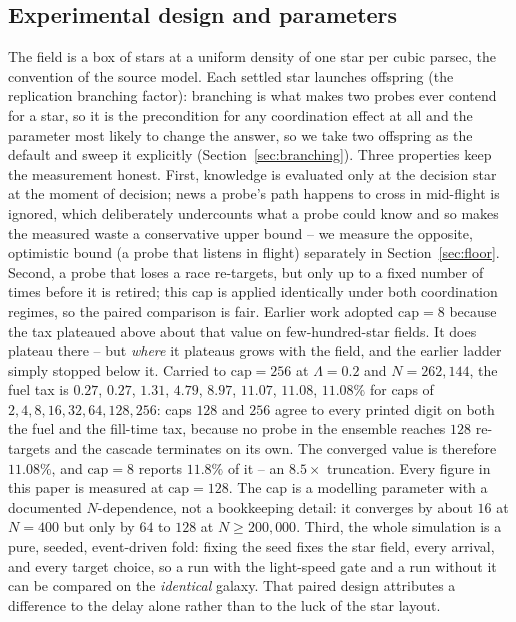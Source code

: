 \subsection{Experimental design and parameters}
The field is a box of stars at a uniform density of one star per cubic parsec, the convention of
the source model. Each settled star launches offspring (the replication branching factor):
branching is what makes two probes ever contend for a star, so it is the precondition for any
coordination effect at all and the parameter most likely to change the answer, so we take two
offspring as the default and sweep it explicitly (Section~\ref{sec:branching}). Three properties
keep the measurement honest. First, knowledge is evaluated only at the decision star at the moment
of decision; news a probe's path happens to cross in mid-flight is ignored, which deliberately
undercounts what a probe could know and so makes the measured waste a conservative upper bound --
we measure the opposite, optimistic bound (a probe that listens in flight) separately in
Section~\ref{sec:floor}. Second, a probe that loses a race re-targets, but only up to a fixed
number of times before it is retired; this cap is applied identically under both coordination
regimes, so the paired comparison is fair. Earlier work adopted $\text{cap} = 8$ because the tax plateaued above about that value on
few-hundred-star fields. It does plateau there -- but \emph{where} it plateaus grows with the field,
and the earlier ladder simply stopped below it. Carried to $\text{cap} = 256$ at $\Lambda = 0.2$ and
$N = 262{,}144$, the fuel tax is $0.27$, $0.27$, $1.31$, $4.79$, $8.97$, $11.07$, $11.08$, $11.08\%$
for caps of $2, 4, 8, 16, 32, 64, 128, 256$: caps $128$ and $256$ agree to every printed digit on
both the fuel and the fill-time tax, because no probe in the ensemble reaches $128$ re-targets and
the cascade terminates on its own. The converged value is therefore $11.08\%$, and $\text{cap} = 8$
reports $11.8\%$ of it -- an $8.5\times$ truncation. Every figure in this paper is measured at
$\text{cap} = 128$. The cap is a modelling parameter with a documented $N$-dependence, not a
bookkeeping detail: it converges by about $16$ at $N = 400$ but only by $64$ to $128$ at
$N \geq 200{,}000$. Third, the whole simulation is a pure,
seeded, event-driven fold: fixing the seed fixes the star field, every arrival, and every target
choice, so a run with the light-speed gate and a run without it can be compared on the
\emph{identical} galaxy. That paired design attributes a difference to the delay alone rather than
to the luck of the star layout.

